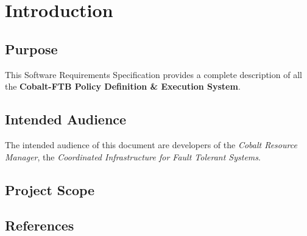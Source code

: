 \section{Introduction}
\subsection{Purpose}
This Software Requirements Specification provides a complete
description of all the \textbf{Cobalt-FTB Policy Definition \& Execution System}. 

\subsection{Intended Audience}
The intended audience of this document are developers of the \emph{Cobalt Resource Manager}, the \emph{Coordinated Infrastructure for Fault Tolerant Systems}.

\subsection{Project Scope}

\subsection{References}

